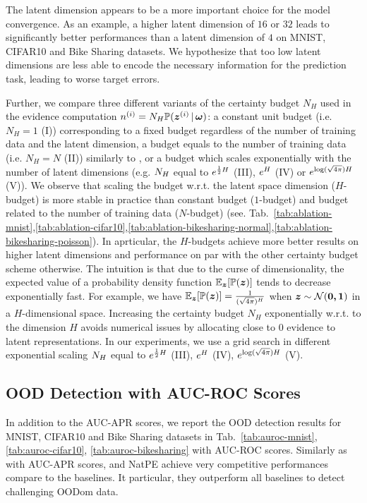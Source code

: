 The latent dimension appears to be a more important choice for the model convergence. As an example, a higher latent dimension of $16$ or $32$ leads to significantly better performances than a latent dimension of $4$ on MNIST, CIFAR10 and Bike Sharing datasets. We hypothesize that too low latent dimensions are less able to encode the necessary information for the prediction task, leading to worse target errors.

Further, we compare three different variants of the certainty budget $N_H$ used in the evidence computation $n^{(i)} = N_H\mathbb{P}(\bm{z}^{(i)} \,|\, \bm{\omega})$: a constant unit budget (i.e. $N_H=1$ (I)) corresponding to a fixed budget regardless of the number of training data and the latent dimension, a budget equals to the number of training data (i.e. $N_H=N$ (II)) similarly to \citet{postnet}, or a budget which scales exponentially with the number of latent dimensions (e.g. $N_H$ equal to $e^{\frac{1}{2}H}$ (III), $e^{H}$ (IV) or $e^{\log(\sqrt{4\pi})H}$ (V)). We observe that scaling the budget w.r.t. the latent space dimension ($H$-budget) is more stable in practice than constant budget ($1$-budget) and budget related to the number of training data ($N$-budget) (see. Tab.~\ref{tab:ablation-mnist},\ref{tab:ablation-cifar10},\ref{tab:ablation-bikesharing-normal},\ref{tab:ablation-bikesharing-poisson}). In aprticular, the $H$-budgets achieve more  better results on higher latent dimensions and performance on par with the other certainty budget scheme otherwise. The intuition is that due to the curse of dimensionality, the expected value of a probability density function $\operatorname{\mathbb{E}}_{\bm{z}}[\mathbb{P}(\bm{z})]$ tends to decrease exponentially fast. For example, we have $\operatorname{\mathbb{E}}_{\bm{z}}[\mathbb{P}(\bm{z})] = \frac{1}{(\sqrt{4\pi})^H}$ when $\bm{z} \sim \operatorname{\mathcal{N}}(\bm{0, \bm{1}})$ in a $H$-dimensional space. Increasing the certainty budget $N_H$ exponentially w.r.t. to the dimension $H$ avoids numerical issues by allocating close to $0$ evidence to latent representations. In our experiments, we use a grid search in different exponential scaling $N_H$ equal to $e^{\frac{1}{2}H}$ (III), $e^{H}$ (IV),  $e^{\log(\sqrt{4\pi})H}$ (V).

\subsection{OOD Detection with AUC-ROC Scores}
\label{sec:auroc}

In addition to the AUC-APR scores, we report the OOD detection results for MNIST, CIFAR10 and Bike Sharing datasets in Tab.~\ref{tab:auroc-mnist}, \ref{tab:auroc-cifar10}, \ref{tab:auroc-bikesharing} with AUC-ROC scores. Similarly as with AUC-APR scores, \NatPNacro{} and NatPE achieve very competitive performances compare to the baselines. It particular, they outperform all baselines to detect challenging OODom data.


